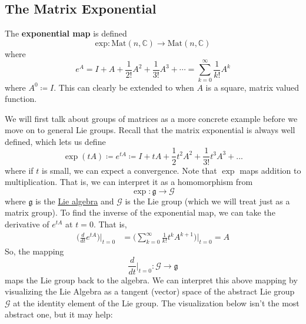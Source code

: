 \documentclass{article}
\newcounter{definition}[section]
\newcounter{example}[section]
\begin{document}
  \subsection{The Matrix Exponential}

    \begin{definition}
      \label{def:matrix-exponential-map}
      The \textbf{exponential map} is defined
      \begin{equation}
        \text{exp}: \text{Mat}(n, \mathbb{C}) \to \text{Mat}(n, \mathbb{C})
      \end{equation}
      where 
      \begin{equation}
        e^A = I + A + \frac{1}{2!} A^2 + \frac{1}{3!} A^3 + \cdots = \sum_{k=0}^\infty \frac{1}{k!} A^k
      \end{equation}
      where $A^0 \coloneqq I$. This can clearly be extended to when $A$ is a square, matrix valued function. 
    \end{definition}
    We will first talk about groups of matrices as a more concrete example before we move on to general Lie groups. Recall that the matrix exponential is always well defined, which lets us define
    \begin{equation}
      \exp(t A) \coloneqq e^{t A} \coloneqq I + tA + \frac{1}{2} t^2 A^2 + \frac{1}{3!} t^3 A^3 + ... 
    \end{equation}
    where if $t$ is small, we can expect a convergence. Note that $\exp$ maps addition to multiplication. That is, we can interpret it as a homomorphism from 
    \begin{equation}
      \exp: \mathfrak{g} \rightarrow \mathcal{G}
    \end{equation}
    where $\mathfrak{g}$ is the \hyperref[def:lie-algebra]{Lie algebra} and $\mathcal{G}$ is the Lie group (which we will treat just as a matrix group). To find the inverse of the exponential map, we can take the derivative of $e^{tA}$ at $t=0$. That is, 
    \begin{align*}
      \bigg(\frac{d}{d t} e^{tA} \bigg) \bigg|_{t=0} & = \bigg(\sum_{k=0}^\infty \frac{1}{k!} t^k A^{k+1} \bigg) \bigg|_{t=0} = A
    \end{align*}
    So, the mapping
    \begin{equation}
      \frac{d}{dt} \bigg|_{t=0}: \mathcal{G} \rightarrow \mathfrak{g}
    \end{equation}
    maps the Lie group back to the algebra. We can interpret this above mapping by visualizing the Lie Algebra as a tangent (vector) space of the abstract Lie group $\mathcal{G}$ at the identity element of the Lie group. The visualization below isn't the most abstract one, but it may help:
\end{document}
